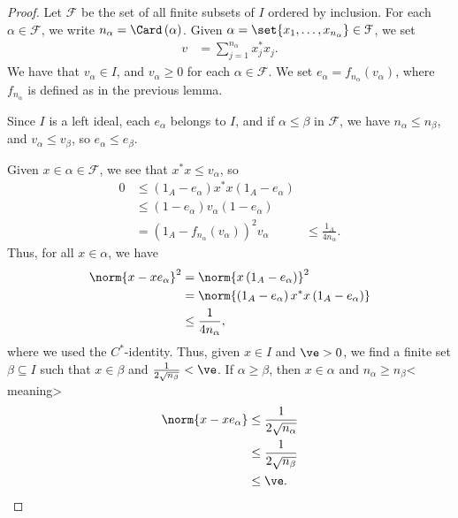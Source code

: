 \documentclass[10pt]{mypackage}
\begin{document}
\begin{proof}
  Let $\mathcal{F}$ be the set of all finite subsets of $I$ ordered by inclusion. For each $\alpha \in \mathcal{F}$, we write $n_{\alpha} = \Card\left(\alpha\right)$. Given $\alpha = \set{x_1,\dots,x_{n_{\alpha}}}\in \mathcal{F}$, we set
  \begin{align*}
    v &= \sum_{j=1}^{n_{\alpha}}x_j^{\ast}x_j.
  \end{align*}
  We have that $v_{\alpha}\in I$, and $v_{\alpha}\geq 0$ for each $\alpha\in \mathcal{F}$. We set $e_{\alpha} = f_{n_{\alpha}}\left(v_{\alpha}\right)$, where $f_{n_{\alpha}}$ is defined as in the previous lemma.\newline

  Since $I$ is a left ideal, each $e_{\alpha}$ belongs to $I$, and if $\alpha \leq \beta$ in $\mathcal{F}$, we have $n_{\alpha}\leq n_{\beta}$, and $v_{\alpha}\leq v_{\beta}$, so $e_{\alpha}\leq e_{\beta}$.\newline

  Given $x\in \alpha\in \mathcal{F}$, we see that $x^{\ast}x \leq v_{\alpha}$, so
  \begin{align*}
    0 &\leq \left(1_{A}-e_{\alpha}\right)x^{\ast}x\left(1_A - e_{\alpha}\right)\\
      &\leq \left(1-e_{\alpha}\right)v_{\alpha}\left(1-e_{\alpha}\right)\\
      &= \left(1_A - f_{n_{\alpha}}\left(v_{\alpha}\right)\right)^2v_{\alpha}
      &\leq \frac{1_A}{4n_{\alpha}}.
  \end{align*}
  Thus, for all $x\in\alpha$, we have
  \begin{align*}
    \norm{x-xe_{\alpha}}^2 &= \norm{x\left(1_A-e_{\alpha}\right)}^2\\
                           &= \norm{\left(1_A-e_{\alpha}\right)x^{\ast}x\left(1_A - e_{\alpha}\right)}\\
                           &\leq \frac{1}{4n_{\alpha}},
  \end{align*}
  where we used the $C^{\ast}$-identity. Thus, given $x\in I$ and $\ve > 0$, we find a finite set $\beta\subseteq I$ such that $x\in\beta$ and $\frac{1}{2\sqrt{n_{\beta}}} < \ve$. If $\alpha\geq \beta$, then $x\in\alpha$ and $n_{\alpha}\geq n_{\beta}$< meaning>
  \begin{align*}
    \norm{x-xe_{\alpha}} &\leq \frac{1}{2\sqrt{n_{\alpha}}}\\
                         &\leq \frac{1}{2\sqrt{n_{\beta}}}\\
                         &\leq \ve.
  \end{align*}
\end{proof}
\end{document}
